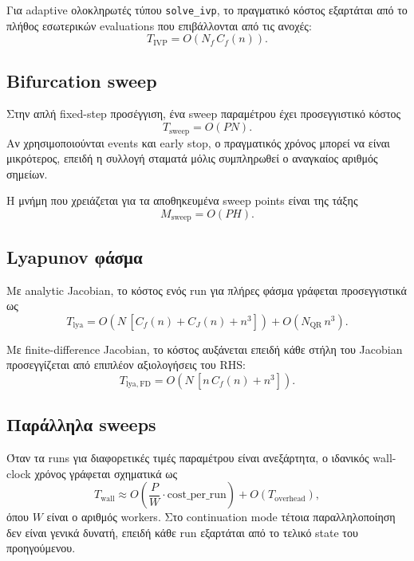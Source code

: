 Για adaptive ολοκληρωτές τύπου \texttt{solve\_ivp}, το πραγματικό κόστος
εξαρτάται από το πλήθος εσωτερικών evaluations που επιβάλλονται από τις
ανοχές:
\begin{equation}
T_{\mathrm{IVP}} = O\!\left(N_f\,C_f(n)\right).
\end{equation}

\subsection{Bifurcation sweep}

Στην απλή fixed-step προσέγγιση, ένα sweep παραμέτρου έχει προσεγγιστικό κόστος
\begin{equation}
T_{\mathrm{sweep}} = O(PN).
\end{equation}
Αν χρησιμοποιούνται events και early stop, ο πραγματικός χρόνος μπορεί να είναι
μικρότερος, επειδή η συλλογή σταματά μόλις συμπληρωθεί ο αναγκαίος αριθμός
σημείων.

Η μνήμη που χρειάζεται για τα αποθηκευμένα sweep points είναι της τάξης
\begin{equation}
M_{\mathrm{sweep}} = O(PH).
\end{equation}

\subsection{Lyapunov φάσμα}

Με analytic Jacobian, το κόστος ενός run για πλήρες φάσμα γράφεται
προσεγγιστικά ως
\begin{equation}
T_{\mathrm{lya}}
=
O\!\left(N\,[C_f(n)+C_J(n)+n^3]\right)
+ O\!\left(N_{\mathrm{QR}}\,n^3\right).
\end{equation}

Με finite-difference Jacobian, το κόστος αυξάνεται επειδή κάθε στήλη του
Jacobian προσεγγίζεται από επιπλέον αξιολογήσεις του RHS:
\begin{equation}
T_{\mathrm{lya,FD}}
=
O\!\left(N\,[n\,C_f(n)+n^3]\right).
\end{equation}

\subsection{Παράλληλα sweeps}

Όταν τα runs για διαφορετικές τιμές παραμέτρου είναι ανεξάρτητα, ο ιδανικός
wall-clock χρόνος γράφεται σχηματικά ως
\begin{equation}
T_{\mathrm{wall}} \approx
O\!\left(\frac{P}{W}\cdot \mathrm{cost\_per\_run}\right)
+ O(T_{\mathrm{overhead}}),
\end{equation}
όπου \(W\) είναι ο αριθμός workers. Στο continuation mode τέτοια
παραλληλοποίηση δεν είναι γενικά δυνατή, επειδή κάθε run εξαρτάται από το
τελικό state του προηγούμενου.

